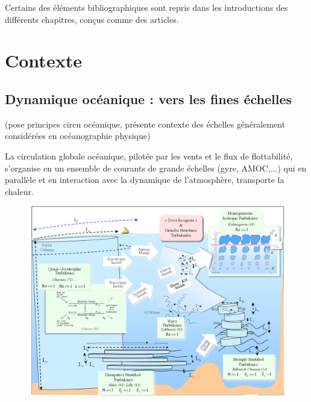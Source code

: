 

Certains des éléments bibliographiques sont repris dans les introductions des différents chapitres, conçus comme des articles.

\section{Contexte}
\subsection{Dynamique océanique : vers les fines échelles}
(pose principes circu océanique, présente contexte des échelles généralement considérées en océanographie physique)

La circulation globale océanique, pilotée par les vents et le flux de flottabilité, s'organise en un ensemble de courants de grande échelles (gyre, AMOC,...) qui en parallèle et en interaction avec la dynamique de l'atmosphère, transporte la chaleur. 
\color{red}
\begin{figure}[!h]
  \centering
  \includegraphics[width=1\textwidth]{./Ocean_scales.png}
  \caption{}
  \label{fig_ocean_scales}
\end{figure}
\color{black}

